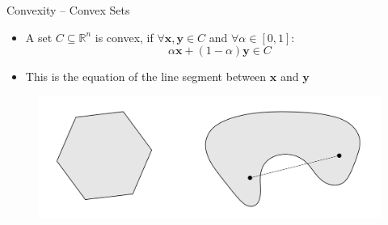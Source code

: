 \begin{frame}{Convexity -- Convex Sets}{}
	\begin{itemize}
		\item A set $C \subseteq \mathbb{R}^n$ is convex, if $\forall \bm{x}, \bm{y} \in C$ and $\forall \alpha \in [0,1]$:
		\begin{equation}	
			\alpha \bm{x} + (1 - \alpha) \bm{y} \in C
		\end{equation}
		\item This is the equation of the line segment between $\bm{x}$ and $\bm{y}$
	\end{itemize}
	
	\vspace*{-3mm}
	\begin{figure}
		\center
		\includegraphics[scale=0.4]{02_math/02_img/convex_sets}
	\end{figure}
\end{frame}


